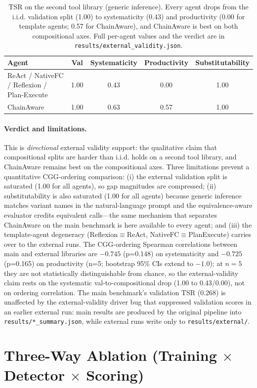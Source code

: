 ﻿\documentclass{article}
\begin{document}
\begin{table}[h]
\centering
\small
\begin{tabular}{lcccc}
\toprule
Agent & Val & Systematicity & Productivity & Substitutability \\
\midrule
ReAct / NativeFC / Reflexion / Plan-Execute & 1.00 & 0.43 & 0.00 & 1.00 \\
ChainAware & 1.00 & 0.63 & 0.57 & 1.00 \\
\bottomrule
\end{tabular}
\caption{TSR on the second tool library (generic inference). Every agent drops
from the i.i.d. validation split (1.00) to systematicity (0.43) and
productivity (0.00 for template agents; 0.57 for ChainAware), and ChainAware
is best on both compositional axes. Full per-agent values and the verdict are
in \texttt{results/external\_validity.json}.}
\label{tab:ext_validity}
\end{table}

\paragraph{Verdict and limitations.} This is \emph{directional} external
validity support: the qualitative claim that compositional splits are harder
than i.i.d. holds on a second tool library, and ChainAware remains best on
the compositional axes. Three limitations prevent a quantitative
CGG-ordering comparison: (i) the external validation split is saturated
(1.00 for all agents), so gap magnitudes are compressed; (ii) substitutability
is also saturated (1.00 for all agents) because generic inference matches
variant names in the natural-language prompt and the equivalence-aware
evaluator credits equivalent calls---the same mechanism that separates
ChainAware on the main benchmark is here available to every agent; and
(iii) the template-agent degeneracy (Reflexion$\equiv$ReAct,
NativeFC$\equiv$PlanExecute) carries over to the external runs. The CGG-ordering
Spearman correlations between main and external libraries are $-0.745$ (p=0.148) on
systematicity and $-0.725$ (p=0.165) on productivity (n=5; bootstrap 95\% CIs extend to
$-1.0$); at $n=5$ they are not statistically distinguishable from chance, so the
external-validity claim rests on the systematic val-to-compositional drop (1.00 to
0.43/0.00), not on ordering correlation. The main
benchmark's validation TSR (0.268) is unaffected by the external-validity
driver bug that suppressed validation scores in an earlier external run:
main results are produced by the original pipeline into
\texttt{results/*\_summary.json}, while external runs write only to
\texttt{results/external/}.\section{Three-Way Ablation (Training $\times$ Detector $\times$ Scoring)}
\end{document}
